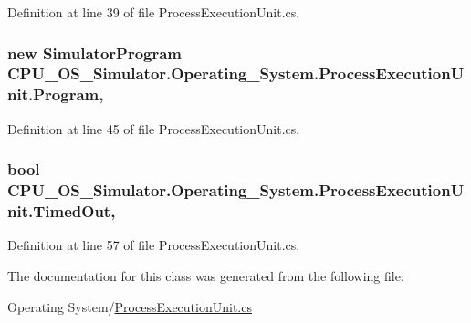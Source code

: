 Definition at line 39 of file Process\+Execution\+Unit.\+cs.

\hypertarget{class_c_p_u___o_s___simulator_1_1_operating___system_1_1_process_execution_unit_ad5ee10381cd66c0681f1a7be91b679e4}{}
\subsubsection[{Program}]{\setlength{\rightskip}{0pt plus 5cm}new {\bf Simulator\+Program} C\+P\+U\+\_\+\+O\+S\+\_\+\+Simulator.\+Operating\+\_\+\+System.\+Process\+Execution\+Unit.\+Program\hspace{0.3cm}{\ttfamily [get]}, {\ttfamily [set]}}\label{class_c_p_u___o_s___simulator_1_1_operating___system_1_1_process_execution_unit_ad5ee10381cd66c0681f1a7be91b679e4}


Definition at line 45 of file Process\+Execution\+Unit.\+cs.

\hypertarget{class_c_p_u___o_s___simulator_1_1_operating___system_1_1_process_execution_unit_aa507b44c8134ffd0e9fbe702e1bf9e32}{}
\subsubsection[{Timed\+Out}]{\setlength{\rightskip}{0pt plus 5cm}bool C\+P\+U\+\_\+\+O\+S\+\_\+\+Simulator.\+Operating\+\_\+\+System.\+Process\+Execution\+Unit.\+Timed\+Out\hspace{0.3cm}{\ttfamily [get]}, {\ttfamily [set]}}\label{class_c_p_u___o_s___simulator_1_1_operating___system_1_1_process_execution_unit_aa507b44c8134ffd0e9fbe702e1bf9e32}


Definition at line 57 of file Process\+Execution\+Unit.\+cs.



The documentation for this class was generated from the following file\+:\begin{DoxyCompactItemize}
\item 
Operating System/\hyperlink{_process_execution_unit_8cs}{Process\+Execution\+Unit.\+cs}\end{DoxyCompactItemize}
